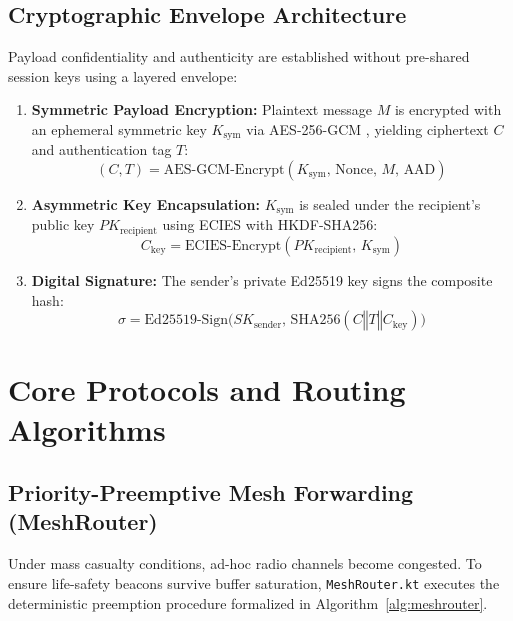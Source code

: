 \documentclass[conference,a4paper]{IEEEtran}
\begin{document}
\subsection{Cryptographic Envelope Architecture}
Payload confidentiality and authenticity are established without pre-shared session keys using a layered envelope:
\begin{enumerate}
    \item \textbf{Symmetric Payload Encryption:} Plaintext message $M$ is encrypted with an ephemeral symmetric key $K_{\text{sym}}$ via AES-256-GCM \cite{19}, yielding ciphertext $C$ and authentication tag $T$:
    \begin{equation}
    (C, T) = \text{AES-GCM-Encrypt}(K_{\text{sym}},\, \text{Nonce},\, M,\, \text{AAD})
    \label{eq:aead}
    \end{equation}
    \item \textbf{Asymmetric Key Encapsulation:} $K_{\text{sym}}$ is sealed under the recipient's public key $PK_{\text{recipient}}$ using ECIES with HKDF-SHA256:
    \begin{equation}
    C_{\text{key}} = \text{ECIES-Encrypt}(PK_{\text{recipient}},\, K_{\text{sym}})
    \label{eq:ecies}
    \end{equation}
    \item \textbf{Digital Signature:} The sender's private Ed25519 key signs the composite hash:
    \begin{equation}
    \sigma = \text{Ed25519-Sign}\bigl(SK_{\text{sender}},\, \text{SHA256}(C \mathbin{\Vert} T \mathbin{\Vert} C_{\text{key}})\bigr)
    \label{eq:sign}
    \end{equation}
\end{enumerate}

\section{Core Protocols and Routing Algorithms}
\subsection{Priority-Preemptive Mesh Forwarding (MeshRouter)}
Under mass casualty conditions, ad-hoc radio channels become congested. To ensure life-safety beacons survive buffer saturation, \texttt{MeshRouter.kt} executes the deterministic preemption procedure formalized in Algorithm~\ref{alg:meshrouter}.
\end{document}
